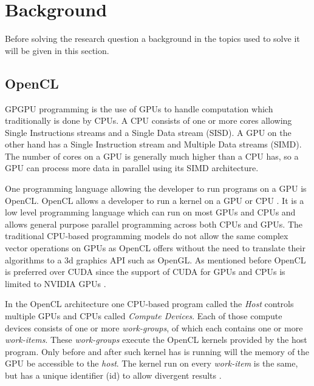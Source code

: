 \section{Background}
Before solving the research question a background in the topics used to solve it will be given in this section.

\subsection{OpenCL}
GPGPU programming is the use of GPUs to handle computation which traditionally is done by CPUs.
A CPU consists of one or more cores allowing Single Instructions streams and a Single Data stream (SISD).
A GPU on the other hand has a Single Instruction stream and Multiple Data streams (SIMD).
The number of cores on a GPU is generally much higher than a CPU has, so a GPU can process more data in parallel using its SIMD architecture.

One programming language allowing the developer to run programs on a GPU is OpenCL.
OpenCL allows a developer to run a kernel on a GPU or CPU \cite{OpenCL}.
It is a low level programming language which can run on most GPUs and CPUs and allows general purpose parallel programming across both CPUs and GPUs.
The traditional CPU-based programming models do not allow the same complex vector operations on GPUs as OpenCL offers without the need to translate their algorithms to a 3d graphics API such as OpenGL.
As mentioned before OpenCL is preferred over CUDA since the support of CUDA for GPUs and CPUs is limited to NVIDIA GPUs \cite{CUDA}.

In the OpenCL architecture one CPU-based program call\-ed the \textit{Host} controls multiple GPUs and CPUs called \textit{Compute Devices}.
Each of those compute devices consists of one or more \textit{work-groups}, of which each contains one or more \textit{work-items}.
These \textit{work-groups} execute the OpenCL kernels provided by the host program.
Only before and after such kernel has is running will the memory of the GPU be accessible to the \textit{host}.
The kernel run on every \textit{work-item} is the same, but has a unique identifier (id) to allow divergent results \cite{OpenCL}.

\begin{comment}
The memory hierarchy used in OpenCL is not equal to that of the physical memory configuration on GPUs.
This is to prevent having to take into account every type of architecture, which would be tedious work as the amount of types is quite large.
Each of the architectural devices discussed above have their own memory, which is inaccessible to components of the same type.
Every processing element can access its own private memory, the memory of its compute unit, the memory of its compute device.
The host memory can be accessed, but it is generally slower than the on-board memory \cite{OpenCL}.

The architecture and memory hierarchy already enforce the division of the algorithm if one wants to use every component of a GPU.
\end{comment}


